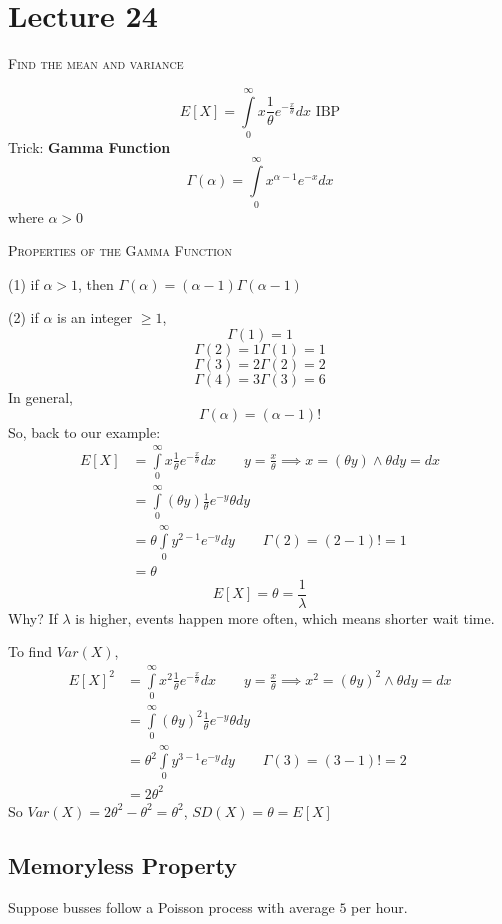 \section{Lecture 24}
\textsc{Find the mean and variance}

\[ E[X]=\int\limits_{0}^{\infty} x \frac{1}{\theta}e^{-\frac{x}{\theta}} d{x}  \text{ IBP} \]
Trick: \textbf{Gamma Function}
\[ \Gamma(\alpha)=\int\limits_{0}^{\infty} x^{\alpha -1}e^{-x} d{x}  \]
where $ \alpha>0 $

\textsc{Properties of the Gamma Function}

(1) if $ \alpha>1 $, then $ \Gamma(\alpha)=(\alpha-1)\Gamma(\alpha-1) $

(2) if $ \alpha $ is an integer $ \ge 1 $,
\[ \Gamma(1)=1 \]
\[ \Gamma(2)=1\Gamma(1)=1 \]
\[ \Gamma(3)=2\Gamma(2)=2 \]
\[ \Gamma(4)=3\Gamma(3)=6 \]
In general,
\[ \Gamma(\alpha)=(\alpha-1)! \]
So, back to our example:
\begin{align*}
    E[X]&=\int\limits_{0}^{\infty} x \frac{1}{\theta}e^{-\frac{x}{\theta}} d{x}\qquad y=\frac{x}{\theta}\implies x=(\theta y) \land \theta dy=dx\\
    &=\int\limits_{0}^{\infty} (\theta y) \frac{1}{\theta} e^{-y}\theta d{y}\\
    &=\theta \int\limits_{0}^{\infty} y^{2-1}e^{-y} d{y}\qquad \Gamma(2)=(2-1)!=1\\
    &=\theta
\end{align*}
\[ E[X]=\theta=\frac{1}{\lambda} \]
Why?
If $ \lambda $ is higher, events happen more often, which means shorter wait time.

To find $ Var(X) $,
\begin{align*}
    E[X]^2&=\int\limits_{0}^{\infty} x^2 \frac{1}{\theta}e^{-\frac{x}{\theta}}  d{x}\qquad y=\frac{x}{\theta}\implies x^2=(\theta y)^2 \land \theta dy=dx\\
    &=\int\limits_{0}^{\infty} (\theta y)^2\frac{1}{\theta}e^{-y}\theta d{y}\\
    &=\theta^2 \int\limits_{0}^{\infty} y^{3-1}e^{-y} d{y} \qquad \Gamma(3)=(3-1)!=2\\
    &=2\theta^2
\end{align*}
So $ Var(X)=2\theta^2-\theta^2=\theta^2 $, $ SD(X)=\theta=E[X] $

\subsection{Memoryless Property}

Suppose busses follow a Poisson process with average $ 5 $ per hour.

